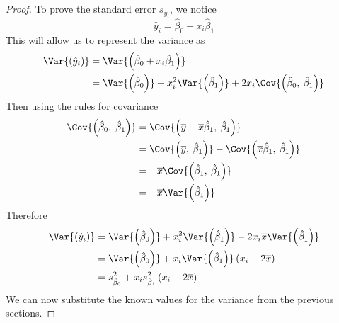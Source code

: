 \documentclass{article}
\begin{document}
\begin{proof}
    To prove the standard error \(s_{\hat{y}_i}\), we notice
    \begin{equation*}
        \hat{y}_i = \hat{\beta}_0 + x_i \hat{\beta}_1
    \end{equation*}
    This will allow us to represent the variance as
    \begin{align*}
        \Var{\left( \hat{y}_i \right)} & = \Var{\left( \hat{\beta}_0 + x_i \hat{\beta}_1 \right)}                                                                                    \\
                                       & = \Var{\left( \hat{\beta}_0 \right)} + x_i^2 \Var{\left( \hat{\beta}_1 \right)} + 2 x_i \Cov{\left( \hat{\beta}_0,\: \hat{\beta}_1 \right)}
    \end{align*}
    Then using the rules for covariance
    \begin{align*}
        \Cov{\left( \hat{\beta}_0,\; \hat{\beta}_1 \right)} & = \Cov{\left( \overline{y} - \overline{x} \hat{\beta}_1,\: \hat{\beta}_1 \right)}                                       \\
                                                            & = \Cov{\left( \overline{y},\: \hat{\beta}_1 \right)} - \Cov{\left( \overline{x} \hat{\beta}_1,\: \hat{\beta}_1 \right)} \\
                                                            & = - \overline{x} \Cov{\left( \hat{\beta}_1,\: \hat{\beta}_1 \right)}                                                    \\
                                                            & = - \overline{x} \Var{\left( \hat{\beta}_1 \right)}
    \end{align*}
    Therefore
    \begin{align*}
        \Var{\left( \hat{y}_i \right)} & = \Var{\left( \hat{\beta}_0 \right)} + x_i^2 \Var{\left( \hat{\beta}_1 \right)} - 2 x_i \overline{x} \Var{\left( \hat{\beta}_1 \right)} \\
                                       & = \Var{\left( \hat{\beta}_0 \right)} + x_i \Var{\left( \hat{\beta}_1 \right)} \left( x_i - 2 \overline{x} \right)                       \\
                                       & = s_{\hat{\beta}_0}^2 + x_i s_{\hat{\beta}_1}^2 \left( x_i - 2 \overline{x} \right)
    \end{align*}
    We can now substitute the known values for the variance from the previous sections.
    \begingroup

\end{proof}
\end{document}

